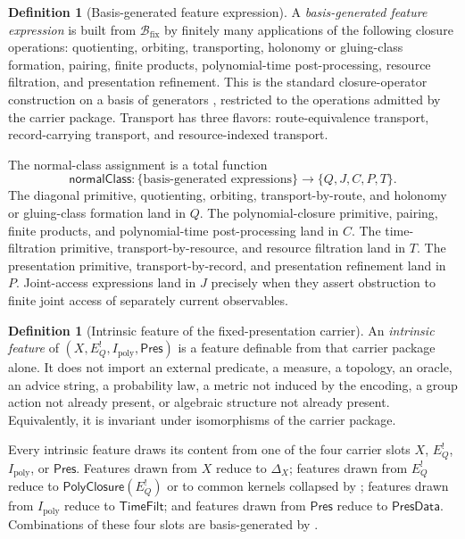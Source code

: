 \documentclass[11pt]{article}
\newcommand{\Ipoly}{I_{\mathrm{poly}}}
\newcommand{\EQbang}{E^{!}_{Q}}
\theoremstyle{definition}
\newtheorem{definition}[theorem]{Definition}
\begin{document}
\begin{definition}[Basis-generated feature expression]
\label{def:pvnp:basis-generated}
A \emph{basis-generated feature expression} is built from
\(\mathcal B_{\mathrm{fix}}\) by finitely many applications of the
following closure operations: quotienting, orbiting, transporting,
holonomy or gluing-class formation, pairing, finite products,
polynomial-time post-processing, resource filtration, and presentation
refinement.  This is the standard closure-operator construction on a
basis of generators \citep{DaveyPriestley2002LatticesOrder}, restricted
to the operations admitted by the carrier package.  Transport has three
flavors: route-equivalence transport, record-carrying transport, and
resource-indexed transport.

The normal-class assignment is a total function
\[
  \mathsf{normalClass}:\{\text{basis-generated expressions}\}
  \longrightarrow \{Q,J,C,P,T\}.
\]
The diagonal primitive, quotienting, orbiting,
transport-by-route, and holonomy or gluing-class formation land in
\(Q\).  The polynomial-closure primitive, pairing, finite products,
and polynomial-time post-processing land in \(C\).  The time-filtration
primitive, transport-by-resource, and resource filtration land in
\(T\).  The presentation primitive, transport-by-record, and
presentation refinement land in \(P\).  Joint-access expressions land
in \(J\) precisely when they assert obstruction to finite joint access
of separately current observables.
\end{definition}

\begin{definition}[Intrinsic feature of the fixed-presentation carrier]
An \emph{intrinsic feature} of
\((X,\EQbang,\Ipoly,\mathsf{Pres})\) is a feature definable from that
carrier package alone.  It does not import an external predicate, a
measure, a topology, an oracle, an advice string, a probability law, a
metric not induced by the encoding, a group action not already present,
or algebraic structure not already present.  Equivalently, it is
invariant under isomorphisms of the carrier package.
\end{definition}

Every intrinsic feature draws its content from one of the four carrier
slots \(X\), \(\EQbang\), \(\Ipoly\), or \(\mathsf{Pres}\).  Features
drawn from \(X\) reduce to \(\Delta_X\); features drawn from
\(\EQbang\) reduce to \(\mathsf{PolyClosure}(\EQbang)\) or to common
kernels collapsed by ; features drawn
from \(\Ipoly\) reduce to \(\mathsf{TimeFilt}\); and features drawn
from \(\mathsf{Pres}\) reduce to \(\mathsf{PresData}\).  Combinations
of these four slots are basis-generated by
.
\end{document}
